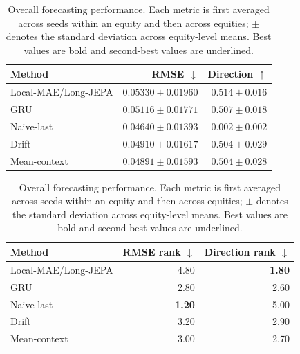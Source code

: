 \begin{table}[t]
\centering
\small
\caption{Overall forecasting performance. Each metric is first averaged across seeds within an equity and then across equities; $\pm$ denotes the standard deviation across equity-level means. Best values are bold and second-best values are underlined.}
\label{tab:main_metrics}
\begin{tabular}{lrr}
\toprule
Method & RMSE $\downarrow$ & Direction $\uparrow$ \\
\midrule
Local-MAE/Long-JEPA & $0.05330 \pm 0.01960$ & \textbf{$0.514 \pm 0.016$} \\
GRU & $0.05116 \pm 0.01771$ & \underline{$0.507 \pm 0.018$} \\
Naive-last & \textbf{$0.04640 \pm 0.01393$} & $0.002 \pm 0.002$ \\
Drift & $0.04910 \pm 0.01617$ & $0.504 \pm 0.029$ \\
Mean-context & \underline{$0.04891 \pm 0.01593$} & $0.504 \pm 0.028$ \\
\bottomrule
\end{tabular}
\par\medskip
\begin{tabular}{lrr}
\toprule
Method & RMSE rank $\downarrow$ & Direction rank $\downarrow$ \\
\midrule
Local-MAE/Long-JEPA & 4.80 & \textbf{1.80} \\
GRU & \underline{2.80} & \underline{2.60} \\
Naive-last & \textbf{1.20} & 5.00 \\
Drift & 3.20 & 2.90 \\
Mean-context & 3.00 & 2.70 \\
\bottomrule
\end{tabular}
\end{table}
